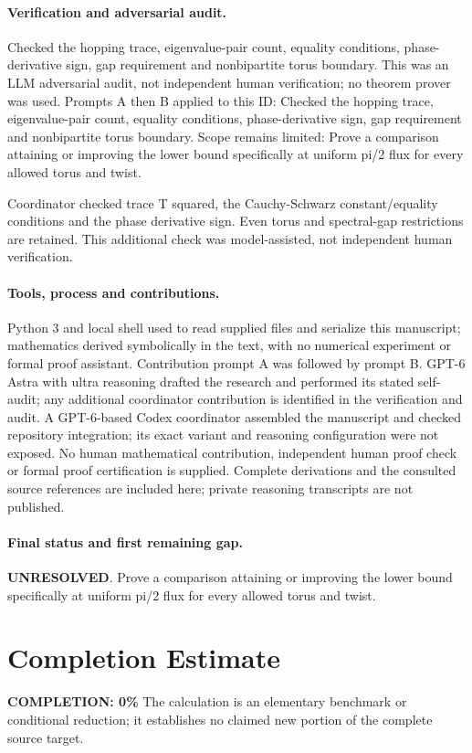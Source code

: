 \documentclass[11pt]{article}
\begin{document}
\paragraph{Verification and adversarial audit.}
Checked the hopping trace, eigenvalue-pair count, equality conditions, phase-derivative sign, gap requirement and nonbipartite torus boundary. This was an LLM adversarial audit, not independent human verification; no theorem prover was used. Prompts A then B applied to this ID: Checked the hopping trace, eigenvalue-pair count, equality conditions, phase-derivative sign, gap requirement and nonbipartite torus boundary. Scope remains limited: Prove a comparison attaining or improving the lower bound specifically at uniform pi/2 flux for every allowed torus and twist.

Coordinator checked trace T squared, the Cauchy-Schwarz constant/equality conditions and the phase derivative sign. Even torus and spectral-gap restrictions are retained. This additional check was model-assisted, not independent human verification.

\paragraph{Tools, process and contributions.}
Python 3 and local shell used to read supplied files and serialize this manuscript; mathematics derived symbolically in the text, with no numerical experiment or formal proof assistant. Contribution prompt A was followed by prompt B. GPT-6 Astra with ultra reasoning drafted the research and performed its stated self-audit; any additional coordinator contribution is identified in the verification and audit. A GPT-6-based Codex coordinator assembled the manuscript and checked repository integration; its exact variant and reasoning configuration were not exposed. No human mathematical contribution, independent human proof check or formal proof certification is supplied. Complete derivations and the consulted source references are included here; private reasoning transcripts are not published.

\paragraph{Final status and first remaining gap.}
\textbf{UNRESOLVED}. Prove a comparison attaining or improving the lower bound specifically at uniform pi/2 flux for every allowed torus and twist.

\section{Completion Estimate}
\noindent\textbf{COMPLETION: 0\%}
The calculation is an elementary benchmark or conditional reduction; it establishes no claimed new portion of the complete source target.
\end{document}
